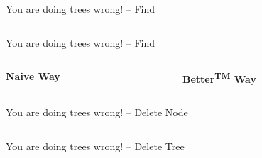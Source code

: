 \documentclass{beamer}
\begin{document}
\begin{frame}{You are doing trees wrong! -- Find}
	\begin{columns}[c]
	\end{columns}
\end{frame}

\begin{frame}{You are doing trees wrong! -- Find}
	\begin{columns}[c]
		\begin{column}[t]{.5\linewidth}{\textbf{Naive Way}}
			
		\end{column}
		\begin{column}[t]{.5\linewidth}{\textbf{Better\textsuperscript{TM} Way}}
			
		\end{column}
	\end{columns}
\end{frame}

\begin{frame}{You are doing trees wrong! -- Delete Node}
	\begin{columns}[c]
	\end{columns}
\end{frame}

\begin{frame}{You are doing trees wrong! -- Delete Tree}
	\begin{columns}[c]
	\end{columns}
\end{frame}
\end{document}
